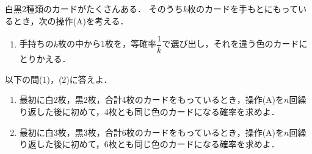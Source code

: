 \documentclass[../../main.tex]{subfiles}
\begin{document}
白黒2種類のカードがたくさんある．
そのうち$k$枚のカードを手もとにもっているとき，次の操作(A)を考える．
\begin{enumerate}
  \item[(A)] 手持ちの$k$枚の中から1枚を，等確率$\displaystyle\dfrac{1}{k}$で選び出し，それを違う色のカードにとりかえる．
\end{enumerate}
以下の問(1)，(2)に答えよ．
\begin{enumerate}
  \item 最初に白2枚，黒2枚，合計4枚のカードをもっているとき，操作(A)を$n$回繰り返した後に初めて，4枚とも同じ色のカードになる確率を求めよ．
  \item 最初に白3枚，黒3枚，合計6枚のカードをもっているとき，操作(A)を$n$回繰り返した後に初めて，6枚とも同じ色のカードになる確率を求めよ．
\end{enumerate}
\end{document}
